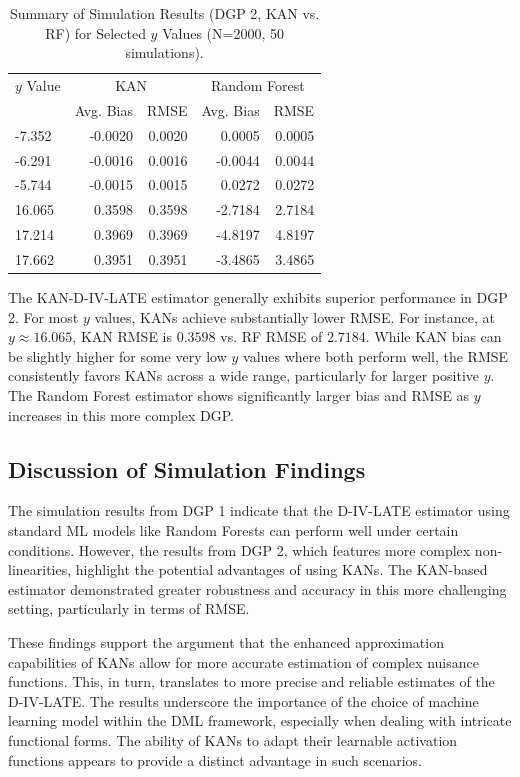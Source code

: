 \documentclass[final,3p,fleqn, 10pt]{elsarticle}
\begin{document}
\begin{table}[htbp]
\centering
\caption{Summary of Simulation Results (DGP 2, KAN vs. RF) for Selected $y$ Values (N=2000, 50 simulations).}
\label{tab:sim_results_summary_dgp2}
\begin{tabular}{@{}lrrrr@{}}
\toprule
$y$ Value & \multicolumn{2}{c}{KAN} & \multicolumn{2}{c}{Random Forest} \\
\cmidrule(lr){2-3} \cmidrule(lr){4-5}
 & Avg. Bias & RMSE & Avg. Bias & RMSE \\
\midrule
-7.352 & -0.0020 & 0.0020 & 0.0005 & 0.0005 \\
-6.291 & -0.0016 & 0.0016 & -0.0044 & 0.0044 \\
-5.744 & -0.0015 & 0.0015 & 0.0272 & 0.0272 \\
16.065 & 0.3598 & 0.3598 & -2.7184 & 2.7184 \\
17.214 & 0.3969 & 0.3969 & -4.8197 & 4.8197 \\
17.662 & 0.3951 & 0.3951 & -3.4865 & 3.4865 \\
\bottomrule
\end{tabular}
\end{table}

The KAN-D-IV-LATE estimator generally exhibits superior performance in DGP 2. For most $y$ values, KANs achieve substantially lower RMSE. For instance, at $y \approx 16.065$, KAN RMSE is $0.3598$ vs. RF RMSE of $2.7184$. While KAN bias can be slightly higher for some very low $y$ values where both perform well, the RMSE consistently favors KANs across a wide range, particularly for larger positive $y$. The Random Forest estimator shows significantly larger bias and RMSE as $y$ increases in this more complex DGP.

\subsection{Discussion of Simulation Findings}
The simulation results from DGP 1 indicate that the D-IV-LATE estimator using standard ML models like Random Forests can perform well under certain conditions. However, the results from DGP 2, which features more complex non-linearities, highlight the potential advantages of using KANs. The KAN-based estimator demonstrated greater robustness and accuracy in this more challenging setting, particularly in terms of RMSE.

These findings support the argument that the enhanced approximation capabilities of KANs allow for more accurate estimation of complex nuisance functions. This, in turn, translates to more precise and reliable estimates of the D-IV-LATE. The results underscore the importance of the choice of machine learning model within the DML framework, especially when dealing with intricate functional forms. The ability of KANs to adapt their learnable activation functions appears to provide a distinct advantage in such scenarios.
\end{document}
